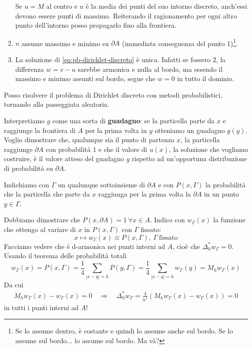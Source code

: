 \documentclass[10pt,a4paper,twoside,openright]{book}
\begin{document}
\begin{enumerate}
\begin{figure}[htpb]
\begin{tikzpicture}[x=0.75pt,y=0.75pt,yscale=-1,xscale=1]
	      	\end{tikzpicture}
		\end{figure}
		\FloatBarrier
		Se $u=M$ al centro e $u$ è la media dei punti del suo intorno discreto, anch'essi devono essere punti di massimo. Reiterando il ragionamento per ogni altro punto dell'intorno posso propagarlo fino alla frontiera.
	\item $u$ assume massimo e minimo su $\partial A$ (immediata conseguenza del punto 1)\footnote{Se lo assume dentro, è costante e quindi lo assume anche sul bordo. Se lo assume sul bordo... lo assume sul bordo. Ma và?}.
	\item La soluzione di \eqref{eq:pb-dirichlet-discreto} è unica. Infatti se fossero $2$, la differenza $w=v-u$ sarebbe armonica e nulla al bordo, ma essendo il massimo e minimo assunti sul bordo, segue che $w=0$ in tutto il dominio.
\end{enumerate}
Posso risolvere il problema di Dirichlet discreto con metodi probabilistici, tornando alla passeggiata aleatoria. 

Interpretiamo $\displaystyle g$ come una sorta di \textbf{guadagno}: se la particella parte da $\displaystyle x$ e raggiunge la frontiera di $\displaystyle A$ per la prima volta in $\displaystyle y$ otteniamo un guadagno $\displaystyle g(y)$. Voglio dimostrare che, qualunque sia il punto di partenza $\displaystyle x$, la particella raggiunge $\displaystyle \partial A$ con probabilità $\displaystyle 1$ e che il valore di $\displaystyle u(x)$, la soluzione che vogliamo costruire, è il valore atteso del guadagno $\displaystyle g$ rispetto ad un'opportuna distribuzione di probabilità su $\displaystyle \partial A$. 

Indichiamo con $\displaystyle \Gamma $ un qualunque sottoinsieme di $\displaystyle \partial A$ e con $\displaystyle P(x,\Gamma)$ la probabilità che la particella che parte da $\displaystyle x$ raggiunga per la prima volta la $\displaystyle \partial A$ in un punto $\displaystyle y\in \Gamma $. 

Dobbiamo dimostrare che $\displaystyle P(x,\partial A) =1\ \forall x\in A$. Indico con $\displaystyle w_{\Gamma }(x)$ la funzione che ottengo al variare di $\displaystyle x$ in $\displaystyle P(x,\Gamma)$ con $\displaystyle \Gamma $ fissato:
\begin{equation*}
	x\longmapsto w_{\Gamma }(x) \equiv P(x,\Gamma),\ \Gamma \ \text{fissato}
\end{equation*}
Facciamo vedere che è d-armonica nei punti interni ad $\displaystyle A$, cioè che $\displaystyle \Delta ^{*}_{h} w_{\Gamma } =0$. Usando il teorema delle probabilità totali
\begin{equation*}
	w_{\Gamma }(x) =P(x,\Gamma) =\frac{1}{4}\sum _{| x-y| =h} P(y,\Gamma) =\frac{1}{4}\sum _{| x-y| =h} w_{\Gamma }(y) =M_{h} w_{\Gamma }(x)
\end{equation*}
Da cui
\begin{gather*}
	M_{h} w_{\Gamma }(x) -w_{\Gamma }(x) =0 \quad \Rightarrow \quad \Delta ^{*}_{h} w_{\Gamma } =\frac{4}{h^{2}}( M_{h} w_{\Gamma }(x) -w_{\Gamma }(x)) =0
\end{gather*}
in tutti i punti interni ad $A$!
\end{document}
